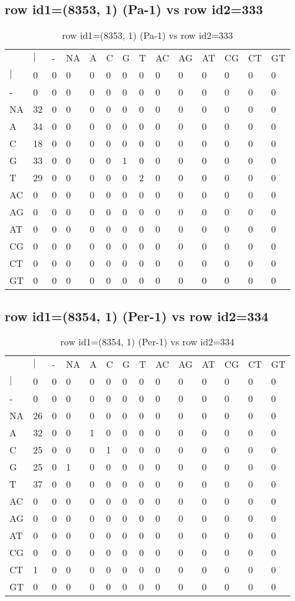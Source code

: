 \subsection{row id1=(8353, 1) (Pa-1) vs row id2=333}
\begin{center}
\begin{longtable}{|l|l|l|l|l|l|l|l|l|l|l|l|l|l|}
\caption{row id1=(8353, 1) (Pa-1) vs row id2=333} \label{table_dm572}\\
\hline
\\
\hline
&$|$&-&NA&A&C&G&T&AC&AG&AT&CG&CT&GT\\
$|$&0&0&0&0&0&0&0&0&0&0&0&0&0\\
-&0&0&0&0&0&0&0&0&0&0&0&0&0\\
NA&32&0&0&0&0&0&0&0&0&0&0&0&0\\
A&34&0&0&0&0&0&0&0&0&0&0&0&0\\
C&18&0&0&0&0&0&0&0&0&0&0&0&0\\
G&33&0&0&0&0&1&0&0&0&0&0&0&0\\
T&29&0&0&0&0&0&2&0&0&0&0&0&0\\
AC&0&0&0&0&0&0&0&0&0&0&0&0&0\\
AG&0&0&0&0&0&0&0&0&0&0&0&0&0\\
AT&0&0&0&0&0&0&0&0&0&0&0&0&0\\
CG&0&0&0&0&0&0&0&0&0&0&0&0&0\\
CT&0&0&0&0&0&0&0&0&0&0&0&0&0\\
GT&0&0&0&0&0&0&0&0&0&0&0&0&0\\
\hline
\end{longtable}
\end{center}

\subsection{row id1=(8354, 1) (Per-1) vs row id2=334}
\begin{center}
\begin{longtable}{|l|l|l|l|l|l|l|l|l|l|l|l|l|l|}
\caption{row id1=(8354, 1) (Per-1) vs row id2=334} \label{table_dm574}\\
\hline
\\
\hline
&$|$&-&NA&A&C&G&T&AC&AG&AT&CG&CT&GT\\
$|$&0&0&0&0&0&0&0&0&0&0&0&0&0\\
-&0&0&0&0&0&0&0&0&0&0&0&0&0\\
NA&26&0&0&0&0&0&0&0&0&0&0&0&0\\
A&32&0&0&1&0&0&0&0&0&0&0&0&0\\
C&25&0&0&0&1&0&0&0&0&0&0&0&0\\
G&25&0&1&0&0&0&0&0&0&0&0&0&0\\
T&37&0&0&0&0&0&0&0&0&0&0&0&0\\
AC&0&0&0&0&0&0&0&0&0&0&0&0&0\\
AG&0&0&0&0&0&0&0&0&0&0&0&0&0\\
AT&0&0&0&0&0&0&0&0&0&0&0&0&0\\
CG&0&0&0&0&0&0&0&0&0&0&0&0&0\\
CT&1&0&0&0&0&0&0&0&0&0&0&0&0\\
GT&0&0&0&0&0&0&0&0&0&0&0&0&0\\
\hline
\end{longtable}
\end{center}

